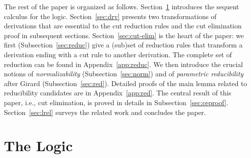 \documentclass[preprint]{elsarticle}
\begin{document}
The rest of the paper is organized as follows. Section~\ref{sec:linc}
introduces the sequent calculus for the logic.  Section~\ref{sec:drv}
presents two transformations of derivations that are essential to the
cut reduction rules and the cut elimination proof in subsequent
sections. Section~\ref{sec:cut-elim} is the heart of the paper: we
first (Subsection~\ref{sec:reduc}) give a (sub)set of reduction rules
that transform a derivation ending with a cut rule to another
derivation. The complete set of reduction can be found in
Appendix~\ref{app:reduc}. We then introduce the crucial notions of
\emph{normalizability} (Subsection~\ref{sec:norm}) and of
\emph{parametric reducibility} after Girard
(Subsection~\ref{sec:red}). Detailed proofs of the main lemma related
to reducibility candidates are in Appendix~\ref{app:red}.  The
central result of this paper, i.e., cut elimination, is proved in
details in Subsection~\ref{sec:ceproof}. Section~\ref{sec:lrel} surveys the related work and
concludes the paper.

\section{The Logic }
\label{sec:linc}
\end{document}
